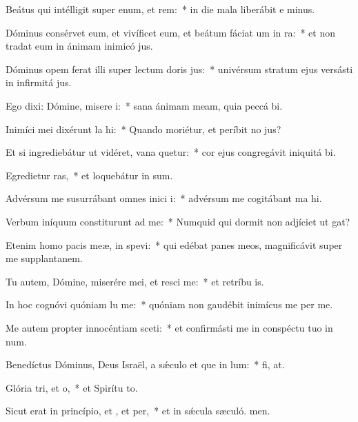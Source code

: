 \item Beátus qui intélligit super enum, et rem:~* in die mala liberábit e minus.
\item Dóminus consérvet eum, et vivíficet eum, et beátum fáciat um in ra:~* et non tradat eum in ánimam inimicó jus.
\item Dóminus opem ferat illi super lectum doris jus:~* univérsum stratum ejus versásti in infirmitá jus.
\item Ego dixi: Dómine, misere i:~* sana ánimam meam, quia peccá bi.
\item Inimíci mei dixérunt la hi:~* Quando moriétur, et períbit no jus?
\item Et si ingrediebátur ut vidéret, vana quetur:~* cor ejus congregávit iniquitá bi.
\item Egredietur ras,~* et loquebátur in sum.
\item Advérsum me susurrábant omnes inici i:~* advérsum me cogitábant ma hi.
\item Verbum iníquum constiturunt ad me:~* Numquid qui dormit non adjíciet ut gat?
\item Etenim homo pacis meæ, in  spevi:~* qui edébat panes meos, magnificávit super me supplantanem.
\item Tu autem, Dómine, miserére mei, et resci me:~* et retríbu is.
\item In hoc cognóvi quóniam lu me:~* quóniam non gaudébit inimícus me per me.
\item Me autem propter innocéntiam sceti:~* et confirmásti me in conspéctu tuo in num.
\item Benedíctus Dóminus, Deus Israël, a sǽculo et que in lum:~* fi, at.
\item Glória tri, et o,~* et Spirítu to.
\item Sicut erat in princípio, et , et per,~* et in sǽcula sæculó. men.

